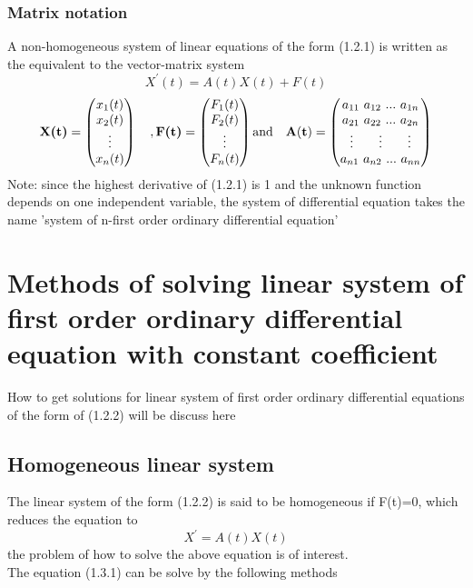 \documentclass[a4paper,12pt]{report}
\numberwithin{equation}{section}
\begin{document}
\subsubsection*{Matrix notation}
A non-homogeneous system of linear equations of the form (1.2.1) is written as the equivalent to the vector-matrix system
\begin{equation}
X^\prime(t)=A(t)X(t)+F(t)
\end{equation}
\[\textbf{X(t)}=\begin{pmatrix}
x_{1}(t)\\
x_{2}(t)\\
\vdots\\
x_{n}(t)
\end{pmatrix}\quad , \textbf{F(t)}=\begin{pmatrix}
F_{1}(t) \\
F_{2}(t) \\
\vdots \\
F_{n}(t)
\end{pmatrix} \text{and}\quad {\bf A(t)}= \left( \begin{matrix}
a_{11} \ a_{12} \ ... \ a_{1n} \\
a_{21} \ a _{22} \ ... \ a_{2n} \\  
\vdots \qquad \vdots \qquad \vdots \\
a_{n1} \ a_{n2} \ ... \ a_{nn}
\end{matrix} \right) \]
Note: since the highest derivative of (1.2.1) is 1 and the unknown function depends on one independent variable, the system of differential equation takes the name 'system of n-first order ordinary differential equation' \\
\section{Methods of solving linear system of first order ordinary differential equation with constant coefficient}
How to get solutions for linear system of first order ordinary differential equations of the form of (1.2.2) will be discuss here
\subsection{Homogeneous linear system}
The linear system of the form (1.2.2) is said to be homogeneous if F(t)=0, which reduces the equation to 
\begin{equation}
X^\prime=A(t)X(t)
\end{equation} 
the problem of how to solve the above equation is of interest. \\
The equation (1.3.1) can be solve by the following methods \\
\end{document}
